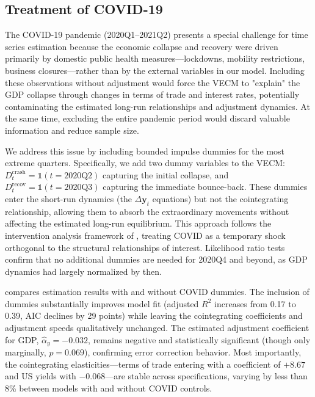 \documentclass[12pt,a4paper]{article}
\numberwithin{equation}{section}
\theoremstyle{definition}
\theoremstyle{remark}
\newcommand{\vect}[1]{\boldsymbol{#1}}
\begin{document}
\subsection{Treatment of COVID-19}

The COVID-19 pandemic (2020Q1--2021Q2) presents a special challenge for time series estimation because the economic collapse and recovery were driven primarily by domestic public health measures---lockdowns, mobility restrictions, business closures---rather than by the external variables in our model. Including these observations without adjustment would force the VECM to "explain" the GDP collapse through changes in terms of trade and interest rates, potentially contaminating the estimated long-run relationships and adjustment dynamics. At the same time, excluding the entire pandemic period would discard valuable information and reduce sample size.

We address this issue by including bounded impulse dummies for the most extreme quarters. Specifically, we add two dummy variables to the VECM: $D^{\text{crash}}_t = \mathbb{1}(t = 2020\text{Q}2)$ capturing the initial collapse, and $D^{\text{recov}}_t = \mathbb{1}(t = 2020\text{Q}3)$ capturing the immediate bounce-back. These dummies enter the short-run dynamics (the $\Delta \vect{y}_t$ equations) but not the cointegrating relationship, allowing them to absorb the extraordinary movements without affecting the estimated long-run equilibrium. This approach follows the intervention analysis framework of \textcite{juselius2006cointegrated}, treating COVID as a temporary shock orthogonal to the structural relationships of interest. Likelihood ratio tests confirm that no additional dummies are needed for 2020Q4 and beyond, as GDP dynamics had largely normalized by then.

 compares estimation results with and without COVID dummies. The inclusion of dummies substantially improves model fit (adjusted $R^2$ increases from 0.17 to 0.39, AIC declines by 29 points) while leaving the cointegrating coefficients and adjustment speeds qualitatively unchanged. The estimated adjustment coefficient for GDP, $\hat{\alpha}_y = -0.032$, remains negative and statistically significant (though only marginally, $p=0.069$), confirming error correction behavior. Most importantly, the cointegrating elasticities---terms of trade entering with a coefficient of $+8.67$ and US yields with $-0.068$---are stable across specifications, varying by less than 8\% between models with and without COVID controls.
\end{document}
